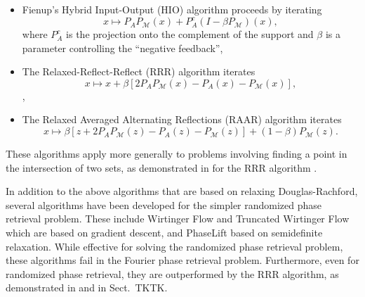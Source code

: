 \documentclass[12pt]{article}
\theoremstyle{definition}
\theoremstyle{remark}
\theoremstyle{definition}
\theoremstyle{problem}
\theoremstyle{definition}
\newcommand{\MM}{\mathcal{M}}
\newcommand{\TODO}[1]{{\color{red}{[#1]}}}
\begin{document}
\begin{itemize}
    \item Fienup's Hybrid Input-Output (HIO) algorithm proceeds by iterating 
    \begin{equation}\label{eq:HIO}
        x\mapsto P_AP_{\MM}(x) + P_A^c(I-\beta P_{\MM})(x),
    \end{equation} 
    where $P_A^c$ is the projection onto the complement of the support and $\beta$ is a parameter controlling the ``negative feedback'',
    \item The Relaxed-Reflect-Reflect (RRR) algorithm iterates
    \begin{equation}\label{eq:RRR}
        x\mapsto x + \beta\left[2P_AP_{\MM}(x)-P_A(x)-P_{\MM}(x)\right],
    \end{equation},
    \item The Relaxed Averaged Alternating Reflections (RAAR) algorithm iterates
    \begin{equation}\label{eq:RAAR}
        x\mapsto \beta\left[z + 2P_AP_{\MM}(z)-P_A(z)-P_{\MM}(z)\right] + (1-\beta)P_{\MM}(z).
    \end{equation}
\end{itemize}
These algorithms apply more generally to problems involving finding a point in the intersection of two sets, as demonstrated in \TODO{Veit, PNAS} for the RRR algorithm \TODO{Actually, "difference map"}.

In addition to the above algorithms that are based on relaxing Douglas-Rachford, several algorithms have been developed for the simpler randomized phase retrieval problem. These include Wirtinger Flow and Truncated Wirtinger Flow which are based on gradient descent, and PhaseLift based on semidefinite relaxation. While effective for solving the randomized phase retrieval problem, these algorithms fail in the Fourier phase retrieval problem. Furthermore, even for randomized phase retrieval, they are outperformed by the RRR algorithm, as demonstrated in \TODO{benchmarks} and in Sect.~TKTK. 
\end{document}
